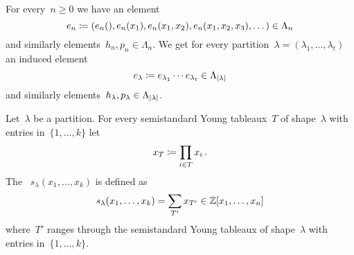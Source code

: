 \documentclass[a4paper,10pt]{scrartcl}
\begin{document}
\begin{example}
  For every~$n \geq 0$ we have an element
  \[
    e_n
    \coloneqq
    (e_n(), e_n(x_1), e_n(x_1, x_2), e_n(x_1, x_2, x_3), \dotsc)
    \in
    \Lambda_n
  \]
  and similarly elements~$h_n, p_n \in \Lambda_n$.
  We get for every partition~$\lambda = (\lambda_1, \dotsc, \lambda_t)$ an induced element
  \[
    e_{\lambda}
    \coloneqq
    e_{\lambda_1} \dotsm e_{\lambda_t}
    \in
    \Lambda_{\lvert\lambda\rvert}
  \]
  and similarly elements~$h_{\lambda}, p_{\lambda} \in \Lambda_{\lvert\lambda\rvert}$.
\end{example}


\begin{example}
  Let~$\lambda$ be a partition.
  For every semistandard Young tableaux~$T$ of shape~$\lambda$ with entries in~$\{1, \dotsc, k\}$ let
  \[
    x_T
    \coloneqq
    \prod_{i \in T} x_i \,.
  \]
  The ~$s_\lambda(x_1, \dotsc, x_k)$ is defined as
  \[
    s_\lambda(x_1, \dotsc, x_k)
    =
    \sum_{T'} x_{T'}
    \in
    \mathbb{Z}[x_1, \dotsc, x_n]
  \]
  where~$T'$ ranges through the semistandard Young tableaux of shape~$\lambda$ with entries in~$\{1, \dotsc, k\}$.
  

\end{example}
\end{document}
